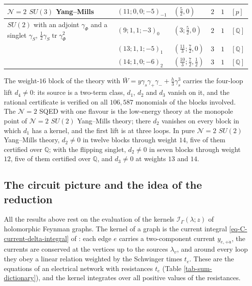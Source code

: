 \documentclass[11pt]{article}
\numberwithin{equation}{section}
\numberwithin{figure}{section}
\numberwithin{table}{section}
\begin{document}
{\begin{xltabular}{\linewidth}{|>{\raggedright\arraybackslash}X|l|l|c|c|l|}
\hline
$\mathcal N=2$ $SU(3)$ Yang--Mills & $(11;0,0;-5)_{-1}$ & $(\tfrac52,0)$ & $2$ & $1$ & $[p]$\\
\hline
$SU(2)$ with an adjoint $\gamma_\Phi$ and a singlet $\gamma_S$, $\tfrac12\gamma_S\operatorname{tr}\gamma_\Phi^2$ & $(9;1,1;-3)_0$ & $(3;\tfrac52,0)$ & $2$ & $1$ & $[\mathbb Q]$\\
 & $(13;1,1;-5)_1$ & $(\tfrac{11}3;\tfrac72,0)$ & $3$ & $1$ & $[\mathbb Q]$\\
 & $(14;1,0;-6)_2$ & $(\tfrac{10}3;\tfrac72,\tfrac12)$ & $3$ & $1$ & $[\mathbb Q]$\\
\hline
\end{xltabular}}

The weight-$16$ block of the theory with $\bar W=y\gamma_s\gamma_+\gamma_-+\tfrac h3\gamma_s^3$ carries the four-loop lift $d_4\ne0$: its source is a two-term class, $d_1$, $d_2$ and $d_3$ vanish on it, and the rational certificate is verified on all $106{,}587$ monomials of the blocks involved. The $\mathcal N=2$ SQED with one flavour is the low-energy theory at the monopole point of $\mathcal N=2$ $SU(2)$ Yang--Mills theory; there $d_2$ vanishes on every block in which $d_1$ has a kernel, and the first lift is at three loops. In pure $\mathcal N=2$ $SU(2)$ Yang--Mills theory, $d_2\ne0$ in twelve blocks through weight $14$, five of them certified over $\mathbb Q$; with the flipping singlet, $d_2\ne0$ in seven blocks through weight $12$, five of them certified over $\mathbb Q$, and $d_3\ne0$ at weights $13$ and $14$.

\subsection{The circuit picture and the idea of the reduction}\label{sec-sum-circuit}

All the results above rest on the evaluation of the kernels $\mathcal I_\Gamma(\lambda;z)$ of holomorphic Feynman graphs. The kernel of a graph is the current integral \eqref{eq-C-current-delta-integral} of \cite{Wang,operatope}: each edge $e$ carries a two-component current $y_{e,+\dot a}$, the currents are conserved at the vertices up to the sources $\lambda_v$, and around every loop they obey a linear relation weighted by the Schwinger times $t_e$. These are the equations of an electrical network with resistances $t_e$ (Table \ref{tab-sum-dictionary}), and the kernel integrates over all positive values of the resistances.
\end{document}

